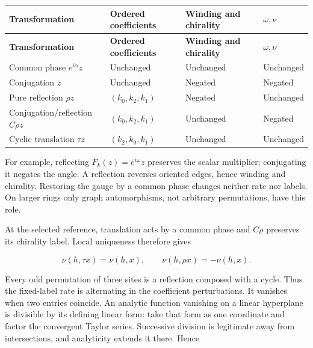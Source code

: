 \documentclass[11pt,a4paper]{article}
\begin{document}
\begingroup\small\setlength{\LTpre}{5pt}\setlength{\LTpost}{7pt}
\begin{longtable}{@{}>{\raggedright\arraybackslash}p{0.2500\dimexpr\textwidth-36pt\relax}>{\raggedright\arraybackslash}p{0.2400\dimexpr\textwidth-36pt\relax}>{\raggedright\arraybackslash}p{0.2700\dimexpr\textwidth-36pt\relax}>{\raggedright\arraybackslash}p{0.2400\dimexpr\textwidth-36pt\relax}@{}}
\toprule
\textbf{Transformation} & \textbf{Ordered coefficients} & \textbf{Winding and chirality} & \textbf{\(\omega,\nu\)}\\ \midrule
\endfirsthead
\textbf{Transformation} & \textbf{Ordered coefficients} & \textbf{Winding and chirality} & \textbf{\(\omega,\nu\)}\\ \midrule
\endhead
\bottomrule\endfoot
Common phase \(e^{i\alpha}z\) & Unchanged & Unchanged & Unchanged\\[4pt]
Conjugation \(\overline z\) & Unchanged & Negated & Negated\\[4pt]
Pure reflection \(\rho z\) & \((k_0,k_2,k_1)\) & Negated & Unchanged\\[4pt]
Conjugation/\allowbreak{}reflection \(C\rho z\) & \((k_0,k_2,k_1)\) & Unchanged & Negated\\[4pt]
Cyclic translation \(\tau z\) & \((k_2,k_0,k_1)\) & Unchanged & Unchanged\\[4pt]
\end{longtable}\endgroup

For example, reflecting \(F_k(z)=e^{i\omega}z\) preserves the scalar multiplier; conjugating it negates the angle. A reflection reverses oriented edges, hence winding and chirality. Restoring the gauge by a common phase changes neither rate nor labels. On larger rings only graph automorphisms, not arbitrary permutations, have this role.

At the selected reference, translation acts by a common phase and \(C\rho\) preserves its chirality label. Local uniqueness therefore gives

\[
\nu(h,\tau x)=\nu(h,x),\qquad \nu(h,\rho x)=-\nu(h,x).
\tag{D28}\label{eq:D28}
\]

Every odd permutation of three sites is a reflection composed with a cycle. Thus the fixed-label rate is alternating in the coefficient perturbations. It vanishes when two entries coincide. An analytic function vanishing on a linear hyperplane is divisible by its defining linear form: take that form as one coordinate and factor the convergent Taylor series. Successive division is legitimate away from intersections, and analyticity extends it there. Hence
\end{document}
